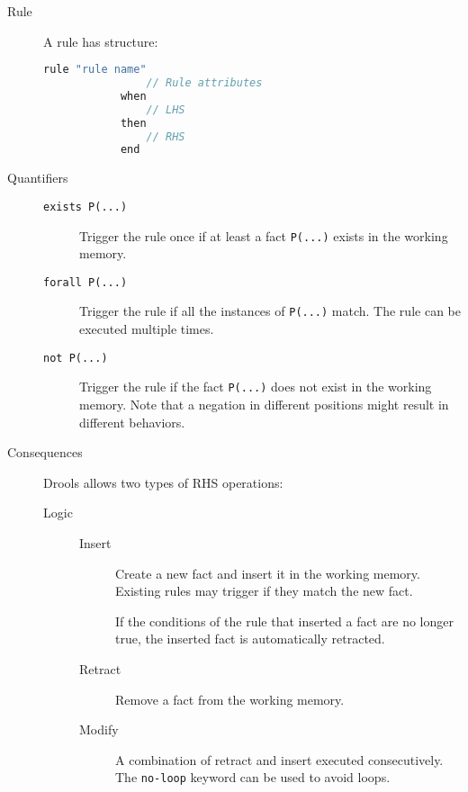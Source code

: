 \begin{description}
    \item[Rule] A rule has structure:
        \begin{lstlisting}[language={java}]
            rule "rule name"
                // Rule attributes
            when
                // LHS
            then
                // RHS
            end
        \end{lstlisting}

    \item[Quantifiers] \phantom{}
        \begin{description}
            \item[\texttt{exists P(...)}] 
                Trigger the rule once if at least a fact \texttt{P(...)} exists in the working memory. 
            \item[\texttt{forall P(...)}] 
                Trigger the rule if all the instances of \texttt{P(...)} match.
                The rule can be executed multiple times. 
            \item[\texttt{not P(...)}] 
                Trigger the rule if the fact \texttt{P(...)} does not exist in the working memory. 
                Note that a negation in different positions might result in different behaviors.
        \end{description}

    \item[Consequences] 
        Drools allows two types of RHS operations:
        \begin{description}
            \item[Logic] \phantom{}
                \begin{description}
                    \item[Insert] 
                        Create a new fact and insert it in the working memory.
                        Existing rules may trigger if they match the new fact.

                        If the conditions of the rule that inserted a fact are no longer true, the inserted fact is automatically retracted.

                    \item[Retract]  Remove a fact from the working memory.
                    
                    \item[Modify] 
                        A combination of retract and insert executed consecutively.
                        The \texttt{no-loop} keyword can be used to avoid loops.
                \end{description}


\end{description}
\end{description}
